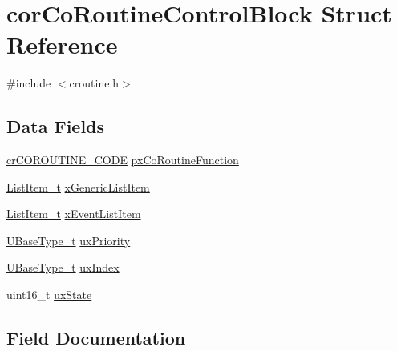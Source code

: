 \hypertarget{structcor_co_routine_control_block}{}\section{cor\+Co\+Routine\+Control\+Block Struct Reference}
\label{structcor_co_routine_control_block}


{\ttfamily \#include $<$croutine.\+h$>$}

\subsection*{Data Fields}
\begin{DoxyCompactItemize}
\item 
\mbox{\hyperlink{croutine_8h_a397a7505718dd366d8411ce324c49758}{cr\+C\+O\+R\+O\+U\+T\+I\+N\+E\+\_\+\+C\+O\+DE}} \mbox{\hyperlink{structcor_co_routine_control_block_aa842d81ed7b4c345cf52cde20c5b22e5}{px\+Co\+Routine\+Function}}
\item 
\mbox{\hyperlink{list_8h_a1a62d469392f9bfe2443e7efab9c8398}{List\+Item\+\_\+t}} \mbox{\hyperlink{structcor_co_routine_control_block_ad91115e6e382ba8961310c4559abc7d2}{x\+Generic\+List\+Item}}
\item 
\mbox{\hyperlink{list_8h_a1a62d469392f9bfe2443e7efab9c8398}{List\+Item\+\_\+t}} \mbox{\hyperlink{structcor_co_routine_control_block_a139605d93d834601f34be927ecba3a15}{x\+Event\+List\+Item}}
\item 
\mbox{\hyperlink{portmacro_8h_a646f89d4298e4f5afd522202b11cb2e6}{U\+Base\+Type\+\_\+t}} \mbox{\hyperlink{structcor_co_routine_control_block_a0befed3dd0fe55b4314158f4814f50ae}{ux\+Priority}}
\item 
\mbox{\hyperlink{portmacro_8h_a646f89d4298e4f5afd522202b11cb2e6}{U\+Base\+Type\+\_\+t}} \mbox{\hyperlink{structcor_co_routine_control_block_a0a9f1b8d3c0676d256f119fdc5fddfb5}{ux\+Index}}
\item 
uint16\+\_\+t \mbox{\hyperlink{structcor_co_routine_control_block_a40a191332ff98e1969a821b870f59531}{ux\+State}}
\end{DoxyCompactItemize}


\subsection{Field Documentation}
\mbox{\label{structcor_co_routine_control_block_aa842d81ed7b4c345cf52cde20c5b22e5}} 
